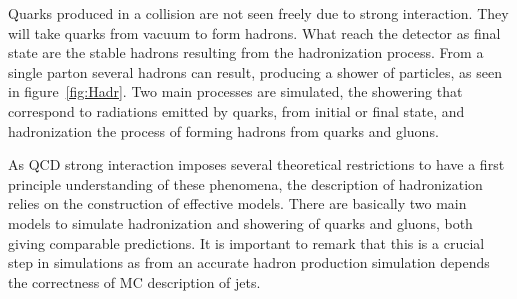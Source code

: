 Quarks produced in a collision are not seen freely due to strong interaction. They will take quarks from vacuum to form hadrons. What reach the detector as final state are the stable hadrons resulting from the hadronization process. From a single parton several hadrons can result, producing a shower of particles, as seen in figure~\ref{fig:Hadr}. Two main processes are simulated, the showering that correspond to radiations emitted by quarks, from initial or final state, and hadronization the process of forming hadrons from quarks and gluons. 

As QCD strong interaction imposes several theoretical restrictions to have a first principle understanding of these phenomena, the description of hadronization relies on the construction of effective models. There are basically two main models to simulate hadronization and showering of quarks and gluons, both giving comparable predictions. It is important to remark that this is a crucial step in simulations as from an accurate hadron production simulation depends the correctness of MC description of jets.

